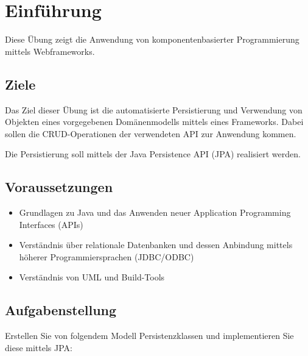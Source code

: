 
\section{Einf{\"u}hrung}

Diese {\"U}bung zeigt die Anwendung von komponentenbasierter Programmierung mittels Webframeworks.

\subsection{Ziele}

Das Ziel dieser {\"U}bung ist die automatisierte Persistierung und Verwendung von Objekten eines vorgegebenen Dom{\"a}nenmodells mittels eines Frameworks. Dabei sollen die CRUD-Operationen der verwendeten API zur Anwendung kommen.

Die Persistierung soll mittels der Java Persistence API (JPA) realisiert werden.

\subsection{Voraussetzungen}

\begin{itemize}
    \item Grundlagen zu Java und das Anwenden neuer Application Programming Interfaces (APIs)
    \item Verst{\"a}ndnis {\"u}ber relationale Datenbanken und dessen Anbindung mittels h{\"o}herer Programmiersprachen (JDBC/ODBC)
    \item Verst{\"a}ndnis von UML und Build-Tools
\end{itemize}

\subsection{Aufgabenstellung}

Erstellen Sie von folgendem Modell Persistenzklassen und implementieren Sie diese mittels JPA:

